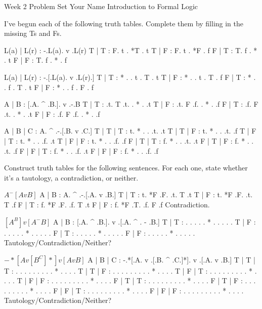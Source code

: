 

\heading
Week 2 Problem Set
Your Name
Introduction to Formal Logic
\endheading

I've begun each of the following truth tables. Complete them by filling in the missing Ts and Fs.

\problems
{}
\truthtable
 L(a) | L(r) : -.L(a).  v  .L(r)
\truthtableline
  T   |  T   : F. t  . *T  . t
  T   |  F   : F. t  . *F  . f
  F   |  T   : T. f  . *   . t
  F   |  F   : T. f  . *   . f
\endtruthtable

\truthtable
 L(a) | L(r) :  -.[.L(a). v .L(r).]
\truthtableline
  T   |  T   : * . . t  . T . t
  T   |  F   : * . . t  . T . f
  F   |  T   : * . . f  . T . t
  F   |  F   : * . . f  . F . f
\endtruthtable

\truthtable
 A | B : [.A. ^ .B.].  v  .-.B
\truthtableline
 T | T :  .t. T .t. . *   . .t
 T | F :  .t. F .f. . *   . .f
 F | T :  .f. F .t. . *   . .t
 F | F :  .f. F .f. . *   . .f
\endtruthtable

\truthtable
 A | B | C : A.  ^  .-.[.B. v .C.]
\truthtableline
 T | T | T : t. *   . . .t.   .t
 T | T | F : t. *   . . .t.   .f
 T | F | T : t. *   . . .f.   .t
 T | F | F : t. *   . . .f.   .f
 F | T | T : f. *   . . .t.   .t
 F | T | F : f. *   . . .t.   .f
 F | F | T : f. *   . . .f.   .t
 F | F | F : f. *   . . .f.   .f
\endtruthtable

\endproblems
\pagebreak

Construct truth tables for the following sentences. For each one, state whether it's a tautology, a contradiction, or neither.

\problems
{}
$ A ^ -[A v B] $
	\answer
	\truthtable
	 A | B : A.  ^  .-.[.A. v .B.]
	\truthtableline
	 T | T : t. *F  .F. .t. T .t
	 T | F : t. *F  .F. .t. T .f
	 F | T : f. *F  .F. .f. T .t
	 F | F : f. *F  .T. .f. F .f
	\endtruthtable
	Contradiction.
	\endanswer

$ [A ^ B] v [A ^ -B] $
	\answer
	\truthtable
	 A | B : [.A. ^ .B.].  v  .[.A. ^ . - .B.]
	\truthtableline
	 T | T :  . .   . . . *   . . .   .   . 
	 T | F :  . .   . . . *   . . .   .   . 
	 F | T :  . .   . . . *   . . .   .   . 
	 F | F :  . .   . . . *   . . .   .   . 
	\endtruthtable
	Tautology/Contradiction/Neither?
	\endanswer

$ -*[A v [B ^ C]*] v [A v B] $
	\answer
	\truthtable
	 A | B | C : -.*[.A. v .[.B. ^ .C.]*].  v  .[.A. v .B.]
	\truthtableline
	 T | T | T :  .  . .   . . .   . .   . *   . . .   . 
	 T | T | F :  .  . .   . . .   . .   . *   . . .   . 
	 T | F | T :  .  . .   . . .   . .   . *   . . .   . 
	 T | F | F :  .  . .   . . .   . .   . *   . . .   . 
	 F | T | T :  .  . .   . . .   . .   . *   . . .   . 
	 F | T | F :  .  . .   . . .   . .   . *   . . .   . 
	 F | F | T :  .  . .   . . .   . .   . *   . . .   . 
	 F | F | F :  .  . .   . . .   . .   . *   . . .   . 
	\endtruthtable
	Tautology/Contradiction/Neither?
	\endanswer

